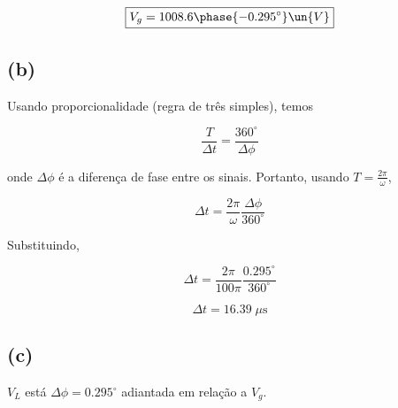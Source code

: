 \[ \boxed{V_g = 1008.6 \phase{-0.295^{\circ}}  \un{V}} \]

\subsection*{(b)}

Usando proporcionalidade (regra de três simples), temos   

\[ \frac{T}{\Delta t} = \frac{360^{\circ}}{\Delta \phi}  \]

onde $\Delta \phi$ é a diferença de fase entre os sinais. Portanto, usando $T = \frac{2\pi}{\omega}$,

\[ \Delta t = \frac{2\pi}{\omega} \frac{\Delta \phi}{360^{\circ}} \]

Substituindo,

\[ \Delta t = \frac{2\pi}{100\pi} \frac{0.295^{\circ}}{360^{\circ}} \]

\[ \boxed{\Delta t = 16.39 \;\mu\textrm{s}} \]

\subsection*{(c)}

$V_L$ está $\Delta \phi = 0.295^{\circ}$ adiantada em relação a $V_g$.









